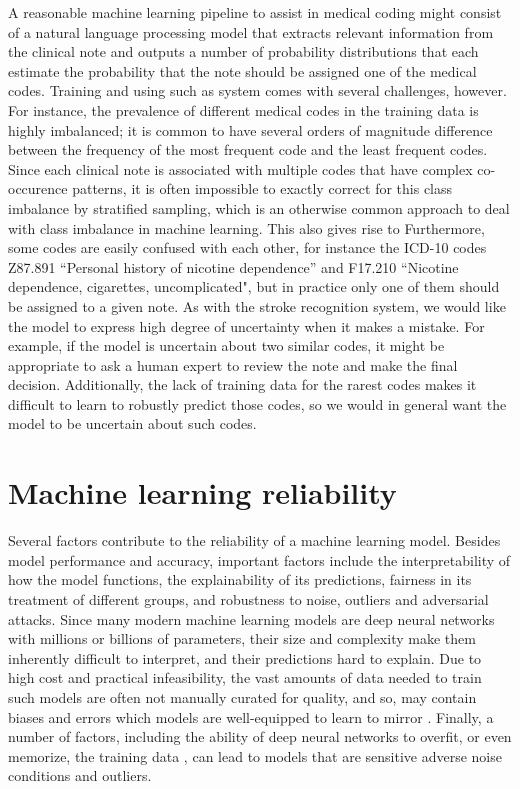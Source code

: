 A reasonable machine learning pipeline to assist in medical coding might consist of a natural language processing model that extracts relevant information from the clinical note and outputs a number of probability distributions that each estimate the probability that the note should be assigned one of the medical codes. Training and using such as system comes with several challenges, however. 
For instance, the prevalence of different medical codes in the training data is highly imbalanced; it is common to have several orders of magnitude difference between the frequency of the most frequent code and the least frequent codes. Since each clinical note is associated with multiple codes that have complex co-occurence patterns, it is often impossible to exactly correct for this class imbalance by stratified sampling, which is an otherwise common approach to deal with class imbalance in machine learning. This also gives rise to 
Furthermore, some codes are easily confused with each other, for instance the ICD-10 codes Z87.891 ``Personal history of nicotine dependence'' and F17.210 ``Nicotine dependence, cigarettes, uncomplicated", but in practice only one of them should be assigned to a given note. 
As with the stroke recognition system, we would like the model to express high degree of uncertainty when it makes a mistake. For example, if the model is uncertain about two similar codes, it might be appropriate to ask a human expert to review the note and make the final decision. Additionally, the lack of training data for the rarest codes makes it difficult to learn to robustly predict those codes, so we would in general want the model to be uncertain about such codes.



\section{Machine learning reliability}
%
Several factors contribute to the reliability of a machine learning model. 
Besides model performance and accuracy, important factors include the interpretability of how the model functions, the explainability of its predictions, fairness in its treatment of different groups, and robustness to noise, outliers and adversarial attacks. 
Since many modern machine learning models are deep neural networks with millions or billions of parameters, their size and complexity make them inherently difficult to interpret, and their predictions hard to explain. Due to high cost and practical infeasibility, the vast amounts of data needed to train such models are often not manually curated for quality, and so, may contain biases and errors which models are well-equipped to learn to mirror \cite{burkart_survey_2021}. 
Finally, a number of factors, including the ability of deep neural networks to overfit, or even memorize, the training data \cite{arpit_closer_2017, burg_memorization_2021}, can lead to models that are sensitive adverse noise conditions and outliers. 

